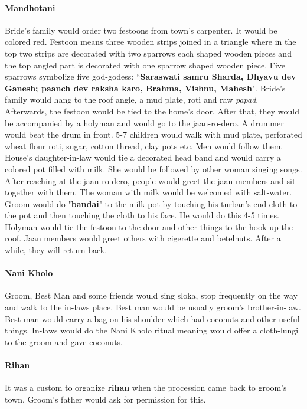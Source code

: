 \paragraph{Mandhotani} Bride's family would order two festoons from town's
carpenter. It would be colored red. Festoon means three wooden strips joined in
a triangle where in the top two strips are decorated with two sparrows each
shaped wooden pieces and the top angled part is decorated with one sparrow
shaped wooden piece. Five sparrows symbolize five god-godess:
``\textbf{Saraswati samru Sharda, Dhyavu dev Ganesh; paanch dev raksha karo,
Brahma, Vishnu, Mahesh}". Bride's family would hang to the roof angle, a mud
plate, roti and raw \textit{papad}. Afterwards, the festoon would be tied to
the home's door. After that, they would be accompanied by a holyman and would
go to the jaan-ro-dero. A drummer would beat the drum in front. 5-7 children
would walk with mud plate, perforated wheat flour roti, sugar, cotton thread,
clay pots etc. Men would follow them. House's daughter-in-law would tie a
decorated head band and would carry a colored pot filled with milk. She would
be followed by other woman singing songs. After reaching at the jaan-ro-dero,
people would greet the jaan members and sit together with them. The woman with
milk would be welcomed with salt-water. Groom would do "\textbf{bandai}" to the
milk pot by touching his turban's end cloth to the pot and then touching the
cloth to his face. He would do this 4-5 times. Holyman would tie the festoon to
the door and other things to the hook up the roof. Jaan members would greet
others with cigerette and betelnuts. After a while, they will return back.

\paragraph{Nani Kholo} Groom, Best Man and some friends would sing sloka, stop
frequently on the way and walk to the in-laws place. Best man would be usually
groom's brother-in-law. Best man would carry a bag on his shoulder which had
coconuts and other useful things. In-laws would do the Nani Kholo ritual
meaning would offer a cloth-lungi to the groom and gave coconuts.

\paragraph{Rihan} It was a custom to organize \textbf{rihan} when the
procession came back to groom's town. Groom's father would ask for permission
for this.

